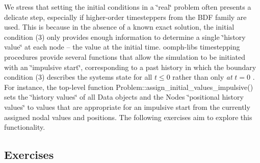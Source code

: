 We stress that setting the initial conditions in a \char`\"{}real\char`\"{} problem often presents a delicate step, especially if higher-\/order timesteppers from the B\+DF family are used. This is because in the absence of a known exact solution, the initial condition (3) only provides enough information to determine a single \char`\"{}history value\char`\"{} at each node -- the value at the initial time. {\ttfamily oomph-\/lib\textquotesingle{}s} timestepping procedures provide several functions that allow the simulation to be initiated with an \char`\"{}impulsive start\char`\"{}, corresponding to a past history in which the boundary condition (3) describes the system\textquotesingle{}s state for all $ t \le 0$ rather than only {\itshape at} $ t = 0$ . For instance, the top-\/level function {\ttfamily Problem\+::assign\+\_\+initial\+\_\+values\+\_\+impulsive()} sets the \char`\"{}history values\char`\"{} of all {\ttfamily Data} objects and the {\ttfamily Nodes\textquotesingle{}} \char`\"{}positional history values\char`\"{} to values that are appropriate for an impulsive start from the currently assigned nodal values and positions. The following exercises aim to explore this functionality.\hypertarget{index_exercises}{}\subsection{Exercises}\label{index_exercises}

